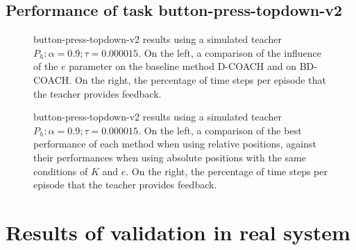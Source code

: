 \subsection{Performance of task button-press-topdown-v2}
\label{subsection:Performance of task button-press-topdown-v2}




 \begin{figure}[H]
  \centering
   \hfill
  \caption{button-press-topdown-v2 results using a simulated teacher $P_h: \alpha = 0.9; \tau =  0.000015$. On the left, a comparison of the influence of the $e$ parameter on the baseline method D-COACH and on BD-COACH. On the right, the percentage of time steps per episode that the teacher provides feedback.}
  \label{fig:results-button-press-topdown-v2-same-buffer}
\end{figure}





 \begin{figure}[H]
  \centering
   \caption{button-press-topdown-v2 results using a simulated teacher $P_h: \alpha = 0.9; \tau =  0.000015$. On the left, a comparison of the best performance of each method when using relative positions, against their performances when using absolute positions with the same conditions of $K$ and $e$. On the right, the percentage of time steps per episode that the teacher  provides feedback.}
  \label{fig:resultsbutton-press-topdown-v2-best}
\end{figure}



\section{Results of validation in real system}
\label{section:results_kuka}


